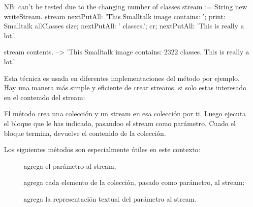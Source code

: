 \documentclass[a4paper,10pt,twoside]{book}
\begin{document}
{\begin{code}{NB: can't be tested due to the changing number of classes}
stream := String new writeStream.
stream
  nextPutAll: 'This Smalltalk image contains: ';
  print: Smalltalk allClasses size;
  nextPutAll: ' classes.';
  cr;
  nextPutAll: 'This is really a lot.'.

stream contents. --> 'This Smalltalk image contains: 2322 classes.
This is really a lot.'
\end{code}

Esta t\'ecnica es usada en diferentes implementaciones del m\'etodo  por ejemplo.
Hay una manera m\'as simple y eficiente de crear streams, si solo estas interesado en el contenido
del stream:

El m\'etodo   crea una colecci\'on y un stream
en esa colecci\'on por ti. Luego ejecuta el bloque que le has indicado, pasandoo el stream como par\'ametro. Cuado el bloque
termina,  devuelve el contenido de la colecci\'on.

Los siguientes m\'etodos  son especialmente \'utiles en este contexto:

\begin{description}
\item[] agrega el par\'ametro al stream;
\item[] agrega cada elemento de la colecci\'on, pasado como par\'ametro, al stream;
\item[] agrega la representaci\'on textual del par\'ametro al stream.
\end{description}

}
\end{document}
